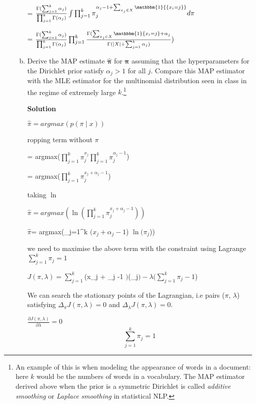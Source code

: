\documentclass[12pt]{article}
\newenvironment{solution}
    { {\fontfamily{lmss}\selectfont 
       \textbf{Solution} 
    }
    { }}
\let\footnote=\endnote
\begin{document}
\begin{enumerate}
\begin{enumerate}[(a)]
= $ \frac{\Gamma(\sum_{j=1}^k \alpha_j)}{\prod_{j=1}^k \Gamma(\alpha_j)} \int \prod_{j=1}^k  \pi_{j}^{\alpha_{j}- 1 + \sum_{x_{j} \in X} \mathbbm{1} {\{x_i = j\}}} d\pi$

= $ \frac{\Gamma(\sum_{j=1}^k \alpha_j)}{\prod_{j=1}^k \Gamma(\alpha_j)}  \prod_{j=1}^k  \frac{\Gamma(\sum_{x_{j} \in X} \mathbbm{1}\{x_{i} = j\} + \alpha_j}{\Gamma(|X| + \sum_{j=1}^k \alpha_j)} )$
\\

\item Derive the MAP estimate $\hat{\bm{\pi}}$ for $\bm{\pi}$ assuming that the hyperparameters for the Dirichlet prior satisfy $\alpha_j > 1$ for all $j$. Compare this MAP estimator with the MLE estimator for the multinomial distribution seen in class in the regime of extremely large $k$.\footnote{An example of this is when modeling the appearance of words in a document: here $k$ would be the numbers of words in a vocabulary. The MAP estimator derived above when the prior is a symmetric Dirichlet is called \emph{additive smoothing} or \emph{Laplace smoothing} in statistical NLP.}


\begin{solution}


$\hat{\pi} = argmax(p(\pi \mid x))$

\end{solution}
 dropping term without $\pi$
 
 = argmax($\prod_{j=1}^k \pi_j^{x_j} \prod_{j=1}^k \pi_j^{\alpha_j -1 } $)

 = argmax($\prod_{j=1}^k \pi_j^{x_j + \alpha_j -1 }  $)
 
 taking $\ln$ 
 
 
 $\hat{\pi} = argmax(\ln(\prod_{j=1}^k \pi_j^{x_j + \alpha_j -1}))$
  
  $\hat{\pi} $= argmax(\sum_{j=1}^{k} $(x_j + \alpha_{j} -1 $) $\ln(\pi_{j}$))
 
 we need to maximise the above term with the constraint using Lagrange  $\sum_{j=1}^{k} \pi_j  = 1$


 $J(\pi, \lambda) = \sum_{j=1}^{k} $(x_j + \alpha_{j} -1 $) $\ln(\pi_{j}$) - \lambda ( \sum_{j=1}^{k} \pi_j  - 1$)
 
  We can search the stationary points of the Lagrangian, i.e pairs ($\pi$, $\lambda$) satisfying
$\Delta_{\pi} J(\pi, \lambda) = 0$ and $\Delta_{\lambda} J(\pi, \lambda) = 0$.

 $\frac{\partial J(\pi, \lambda) }{\partial \lambda} = 0$
 \begin{equation}\label{5}
  \sum_{j=1}^{k} \pi_{j} = 1
 \end{equation}


\end{enumerate}
\end{enumerate}
\end{document}
